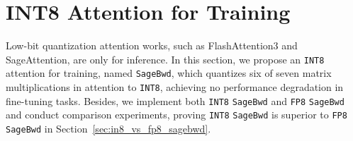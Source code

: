 

\section{INT8 Attention for Training}

Low-bit quantization attention works, such as FlashAttention3 and SageAttention, are only for inference. In this section, we propose an \texttt{INT8} attention for training, named \texttt{SageBwd}, which quantizes six of seven matrix multiplications in attention to \texttt{INT8}, achieving no performance degradation in fine-tuning tasks.
Besides, we implement both \texttt{INT8} \texttt{SageBwd} and \texttt{FP8} \texttt{SageBwd} and conduct comparison experiments, proving \texttt{INT8} \texttt{SageBwd} is superior to \texttt{FP8} \texttt{SageBwd} in Section~\ref{sec:in8_vs_fp8_sagebwd}.


